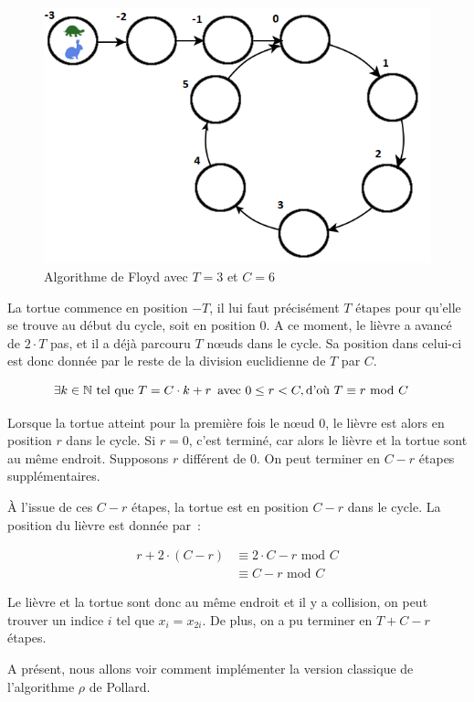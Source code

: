         \begin{figure}
          \center{}
          \includegraphics[scale=0.5]{Floyd.png}
          \caption{Algorithme de Floyd avec $T=3$ et $C=6$}
        \end{figure}

        La tortue commence en position $-T$, il lui faut précisément $T$ étapes pour qu'elle se trouve au début du cycle, soit en position $0$. A ce moment, le lièvre a avancé de $2 \cdot T$ pas, et il a déjà parcouru $T$ nœuds dans le cycle. Sa position dans celui-ci est donc donnée par le reste de la division euclidienne de $T$ par $C$.

        \begin{align*}
          \exists k \in \mathbb{N} \text{\ tel que } T = C \cdot k + r \text{\, avec } 0 \leq r < C, \text{d'où } T &\equiv r \text{\ mod } C
        \end{align*}

        Lorsque la tortue atteint pour la première fois le nœud $0$, le lièvre est alors en position $r$ dans le cycle. Si $r=0$, c'est terminé, car alors le lièvre et la tortue sont au même endroit. Supposons $r$ différent de $0$. On peut terminer en $C-r$ étapes supplémentaires.

        À l'issue de ces $C-r$ étapes, la tortue est en position $C-r$ dans le cycle. La position du lièvre est donnée par~:

        \begin{align*}
          r + 2 \cdot (C - r) &\equiv 2 \cdot C -r \text{\ mod } C \\
                              &\equiv C - r \text{\ mod } C
        \end{align*}

        Le lièvre et la tortue sont donc au même endroit et il y a collision, on peut trouver un indice $i$ tel que $x_i = x_{2i}$. De plus, on a pu terminer en $T + C - r$ étapes.

        A présent, nous allons voir comment implémenter la version classique de l'algorithme $\rho$ de Pollard.
